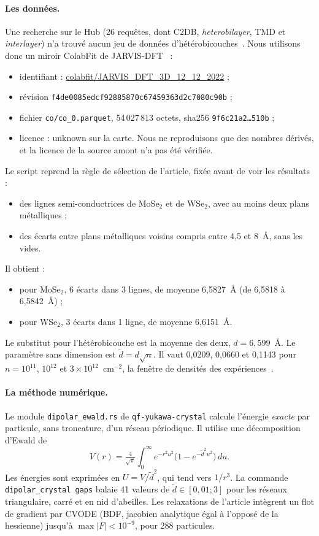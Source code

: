 \paragraph{Les données.} Une recherche sur le Hub (26 requêtes, dont C2DB, \emph{heterobilayer}, TMD et
\emph{interlayer}) n'a trouvé aucun jeu de données d'hétérobicouches~\cite{ch2dip}. Nous utilisons donc un miroir
ColabFit de JARVIS-DFT~\cite{ch5:jarvis} :
\begin{itemize}
\item identifiant : \url{colabfit/JARVIS_DFT_3D_12_12_2022} ;
\item révision \texttt{f4de0085edcf92885870c67459363d2c7080c90b} ;
\item fichier \texttt{co/co\_0.parquet}, 54\,027\,813 octets, sha256 \texttt{9f6c21a2\dots 510b} ;
\item licence : \og unknown \fg{} sur la carte. Nous ne reproduisons que des nombres dérivés, et la licence de la
source amont n'a pas été vérifiée.
\end{itemize}
Le script reprend la règle de sélection de l'article, fixée avant de voir les résultats :
\begin{itemize}
\item des lignes semi-conductrices de MoSe$_2$ et de WSe$_2$, avec au moins deux plans métalliques ;
\item des écarts entre plans métalliques voisins compris entre 4,5 et 8~\AA, sans les vides.
\end{itemize}
Il obtient :
\begin{itemize}
\item pour MoSe$_2$, 6 écarts dans 3 lignes, de moyenne 6,5827~\AA{} (de 6,5818 à 6,5842~\AA) ;
\item pour WSe$_2$, 3 écarts dans 1 ligne, de moyenne 6,6151~\AA.
\end{itemize}
Le substitut pour l'hétérobicouche est la moyenne des deux, $d=6{,}599$~\AA. Le paramètre sans dimension est
$\tilde d=d\sqrt n$. Il vaut 0,0209, 0,0660 et 0,1143 pour $n=10^{11}$, $10^{12}$ et
$3\times10^{12}$~cm$^{-2}$, la fenêtre de densités des expériences~\cite{ch5:wang}.

\paragraph{La méthode numérique.} Le module \texttt{dipolar\_ewald.rs} de \texttt{qf-yukawa-crystal} calcule
l'énergie \emph{exacte} par particule, sans troncature, d'un réseau périodique. Il utilise une décomposition
d'Ewald de
\[V(r)=\tfrac{4}{\sqrt\pi}\int_0^\infty e^{-r^2u^2}\bigl(1-e^{-\tilde d^2u^2}\bigr)\,du .\]
Les énergies sont exprimées en $U=V/\tilde d^2$, qui tend vers $1/r^3$. La commande \texttt{dipolar\_crystal gaps}
balaie 41 valeurs de $\tilde d\in[0{,}01;3]$ pour les réseaux triangulaire, carré et en nid d'abeilles. Les
relaxations de l'article intègrent un flot de gradient par CVODE (BDF, jacobien analytique égal à l'opposé de la
hessienne) jusqu'à $\max|F|<10^{-9}$, pour 288 particules.

